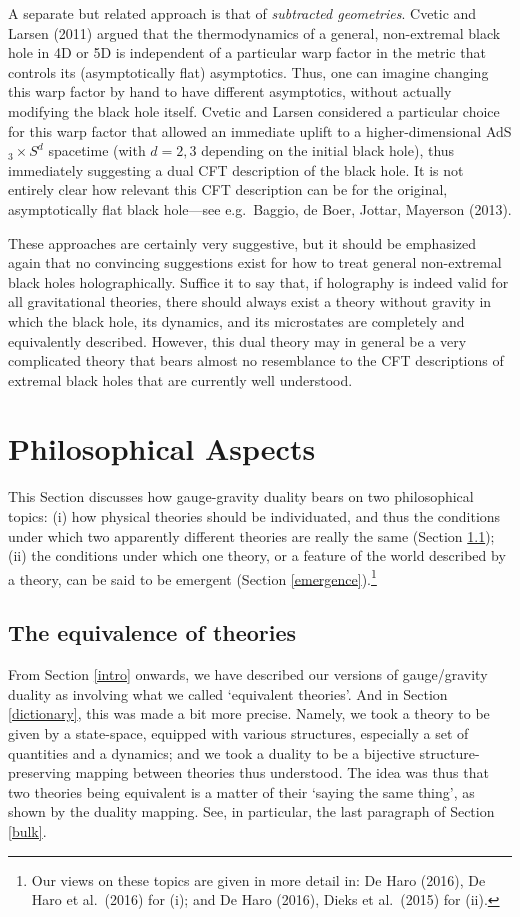 \documentclass[12pt]{article}
\renewcommand{\^}[1]{\hat{#1}}
\begin{document}
A separate but related approach is that of \emph{subtracted geometries}. Cvetic and Larsen (2011) argued that the thermodynamics of a general, non-extremal black hole in 4D or 5D is independent of a particular warp factor in the metric that controls its (asymptotically flat) asymptotics. Thus, one can imagine changing this warp factor by hand to have different asymptotics, without actually modifying the black hole itself. Cvetic and Larsen considered a particular choice for this warp factor that allowed an immediate uplift to a higher-dimensional AdS$_3\times S^d$ spacetime (with $d = 2, 3$ depending on the initial black hole), thus immediately suggesting a dual CFT description of the black hole. It is not entirely clear how relevant this CFT description can be for the original, asymptotically flat black hole---see e.g.~Baggio, de Boer, Jottar, Mayerson (2013).

These approaches are certainly very suggestive, but it should be emphasized again that no convincing suggestions exist for how to treat general non-extremal black holes holographically. Suffice it to say that, if holography is indeed valid for all gravitational theories, there should always exist a theory without gravity in which the black hole, its dynamics, and its microstates are completely and equivalently described. However, this dual theory may in general be a very complicated theory that bears almost no resemblance to the  CFT descriptions of extremal black holes that are currently well understood.  

\section{Philosophical Aspects}\label{philaspects}

This Section discusses how gauge-gravity duality bears on two philosophical topics: (i) how physical theories should be individuated, and thus the conditions under which two apparently different theories are really the same (Section \ref{equivtthies}); (ii) the conditions under which one theory, or a feature of the world described by a theory,  can be said to be emergent  (Section \ref{emergence}).\footnote{\label{philrefs}{Our views on these topics are given in more detail in: De Haro (2016), De Haro et al.~(2016) for (i); and De Haro (2016), Dieks et al.~(2015) for (ii).}}

\subsection{The equivalence  of theories}\label{equivtthies}
From Section \ref{intro} onwards, we have described our versions of gauge/gravity duality as involving what we called `equivalent theories'.  And in Section \ref{dictionary}, this was made a bit more precise. Namely, we took a theory to be given by a state-space, equipped with various structures, especially a set of quantities and a dynamics; and we took a duality to be a bijective structure-preserving mapping between theories thus understood. The idea was thus that two theories being equivalent is a matter of their `saying the same thing', as shown by the duality mapping. See, in particular, the last paragraph of Section \ref{bulk}.
\end{document}
